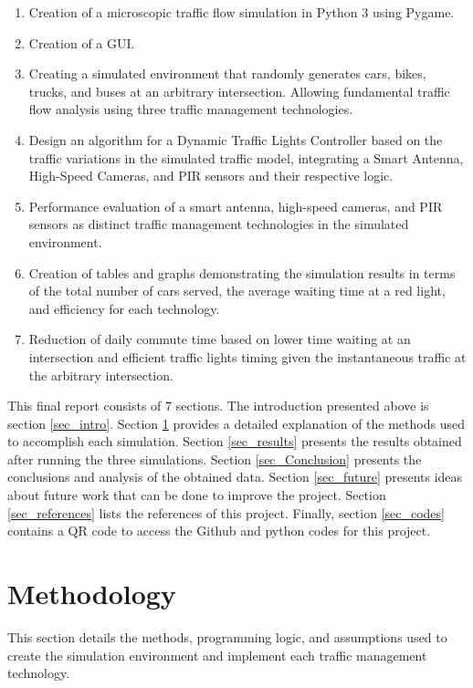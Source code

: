 \documentclass[12pt, a4paper,titlepage]{article}
\begin{document}
\begin{enumerate}
	\item Creation of a microscopic traffic flow simulation in Python 3 using Pygame.
	\item Creation of a GUI.
	\item Creating a simulated environment that randomly generates cars, bikes, trucks, and buses at an arbitrary intersection. Allowing fundamental traffic flow analysis using three traffic management technologies.
	\item Design an algorithm for a Dynamic Traffic Lights Controller based on the traffic variations in the simulated traffic model, integrating a Smart Antenna, High-Speed Cameras, and PIR sensors and their respective logic.
	\item Performance evaluation of a smart antenna, high-speed cameras, and PIR sensors as distinct traffic management technologies in the simulated environment.
	\item Creation of tables and graphs demonstrating the simulation results in terms of the total number of cars served, the average waiting time at a red light, and efficiency for each technology.
	\item Reduction of daily commute time based on lower time waiting at an intersection and efficient traffic lights timing given the instantaneous traffic at the arbitrary intersection.
\end{enumerate}

This final report consists of 7 sections. The introduction presented above is section \ref{sec_intro}. Section \ref{sec_Methodology} provides a detailed explanation of the methods used to accomplish each simulation. Section \ref{sec_results} presents the results obtained after running the three simulations. Section \ref{sec_Conclusion} presents the conclusions and analysis of the obtained data. Section \ref{sec_future} presents ideas about future work that can be done to improve the project. Section \ref{sec_references} lists the references of this project. Finally, section \ref{sec_codes} contains a QR code to access the Github and python codes for this project.

\newpage
\section{Methodology}
\label{sec_Methodology}

This section details the methods, programming logic, and assumptions used to create the simulation environment and implement each traffic management technology.
\end{document}
